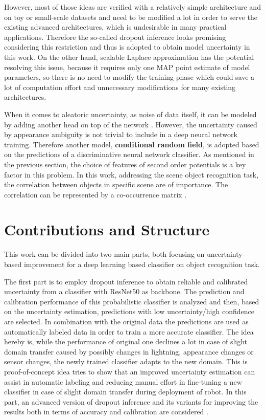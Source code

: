 However, most of those ideas are verified with a relatively simple architecture and on toy or small-scale datasets and need to be modified a lot in order to serve the existing advanced architectures, which is undesirable in many practical applications. Therefore the so-called dropout inference\cite{gal2016dropout} looks promising considering this restriction and thus is adopted to obtain model uncertainty in this work. On the other hand, scalable Laplace approximation \cite{ritter2018scalable} has the potential resolving this issue, because it requires only one MAP point estimate of model parameters, so there is no need to modify the training phase which could save a lot of computation effort and unnecessary modifications for many existing architectures.

When it comes to aleatoric uncertainty, as noise of data itself, it can be modeled by adding another head on top of the network \cite{kendall2017uncertainties}. However, the uncertainty caused by appearance ambiguity is not trivial to include in a deep neural network training. Therefore another model, \textbf{conditional random field}\cite{lafferty2001conditional}, is adopted based on the predictions of a discriminative neural network classifier. As mentioned in the previous section, the choice of features of second order potentials is a key factor in this problem. In this work, addressing the scene object recognition task, the correlation between objects in specific scene are of importance. The correlation can be represented by a co-occurrence matrix \cite{ladicky2010graph}\cite{rasiwasia2009holistic}\cite{galleguillos2008object}\cite{rabinovich2007objects}.

\section{Contributions and Structure}
This work can be divided into two main parts, both focusing on uncertainty-based improvement for a deep learning based classifier on object recognition task. 

The first part is to employ dropout inference to obtain reliable and calibrated uncertainty from a classifier with ResNet50\cite{he2016deep} as backbone. The prediction and calibration performance of this probabilistic classifier is analyzed and then, based on the uncertainty estimation, predictions with low uncertainty/high confidence are selected. In combination with the original data the predictions are used as automatically labeled data in order to train a more accurate classifier. The idea hereby is, while the performance of original one declines a lot in case of slight domain transfer caused by possibly changes in lightning, appearance changes or sensor changes, the newly trained classifier adapts to the new domain. This is proof-of-concept idea tries to show that an improved uncertainty estimation can assist in automatic labeling and reducing manual effort in fine-tuning a new classifier in case of slight domain transfer during deployment of robot. In this part, an advanced version of dropout inference and its variants for improving the results both in terms of accuracy and calibration are considered . 

